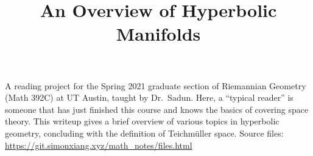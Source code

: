 \documentclass[10pt]{article}
\title{An Overview of Hyperbolic Manifolds}
\begin{document}
\maketitle
A reading project for the Spring 2021 graduate section of Riemannian Geometry (Math 392C) at UT Austin, taught by Dr.\ Sadun. 
Here, a ``typical reader'' is someone that has just finished this course and knows the basics of covering space theory.
This writeup gives a brief overview of various topics in hyperbolic geometry, concluding with the definition of Teichm\"uller space. Source files: \url{https://git.simonxiang.xyz/math_notes/files.html}

\tableofcontents
\newpage
    
\end{document}
